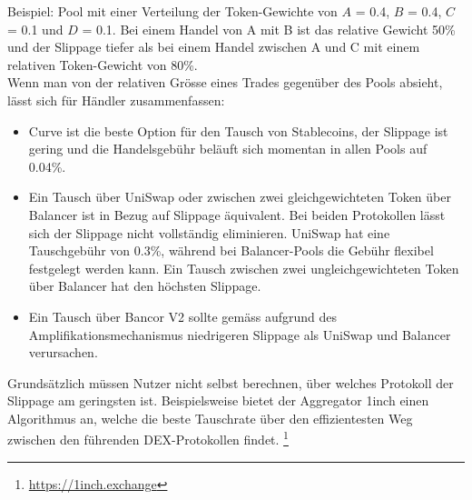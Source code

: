 \documentclass[12pt,a4paper,titlepage,oneside,english]{article}
\begin{document}
Beispiel: Pool mit einer Verteilung der Token-Gewichte von $A$ = 0.4, $B$ = 0.4, $C$ = 0.1 und $D$ = 0.1. Bei einem Handel von A mit B ist das relative Gewicht 50\% und der Slippage tiefer als bei einem Handel zwischen A und C mit einem relativen Token-Gewicht von 80\%. \citep[vgl.][]{Martinelli8020} \\
Wenn man von der relativen Grösse eines Trades gegenüber des Pools absieht, lässt sich für Händler zusammenfassen:
\begin{itemize}
\item{Curve ist die beste Option für den Tausch von Stablecoins, der Slippage ist gering und die Handelsgebühr beläuft sich momentan in allen Pools auf 0.04\%.}
\item{Ein Tausch über UniSwap oder zwischen zwei gleichgewichteten Token über Balancer ist in Bezug auf Slippage äquivalent. Bei beiden Protokollen lässt sich der Slippage nicht vollständig eliminieren. UniSwap hat eine Tauschgebühr von 0.3\%, während bei Balancer-Pools die Gebühr flexibel festgelegt werden kann. %
Ein Tausch zwischen zwei ungleichgewichteten Token über Balancer hat den höchsten Slippage.}
\item{Ein Tausch über Bancor V2 sollte gemäss \citet{Shachav2020} aufgrund des Amplifikationsmechanismus niedrigeren Slippage als UniSwap und Balancer verursachen.}
\end{itemize}
Grundsätzlich müssen Nutzer nicht selbst berechnen, über welches Protokoll der Slippage am geringsten ist. Beispielsweise bietet der Aggregator {\glqq 1inch\grqq} einen Algorithmus an, welche die beste Tauschrate über den effizientesten Weg zwischen den führenden DEX-Protokollen findet. \footnote{\url{https://1inch.exchange}}
\end{document}
